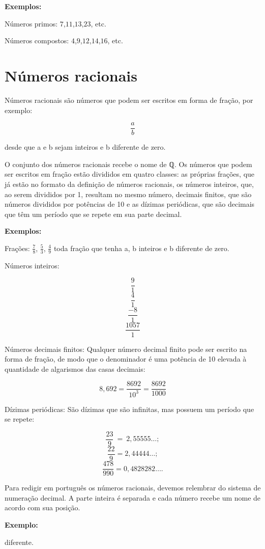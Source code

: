 \textbf{Exemplos:}

Números primos: $7$,$11$,$13$,$23$, etc.

Números compostos: $4$,$9$,$12$,$14$,$16$, etc.

\section{Números racionais}

Números racionais são números que podem ser escritos em forma de fração,
por exemplo:

$$\frac{a}{b}$$

desde que a e b sejam inteiros e b diferente de zero.

O conjunto dos números racionais recebe o nome de ℚ. Os números que
podem ser escritos em fração estão divididos em quatro classes: as
próprias frações, que já estão no formato da definição de números
racionais, os números inteiros, que, ao serem divididos por 1, resultam
no mesmo número, decimais finitos, que são números divididos por
potências de 10 e as dízimas periódicas, que são decimais que têm um
período que se repete em sua parte decimal.

\textbf{Exemplos:}

Frações: $\frac{7}{8}$, $\frac{5}{3}$, $\frac{4}{9}$ toda fração que tenha a,
b inteiros e b diferente de zero.

Números inteiros:

 $$\frac{9}{1}$$
 $$\frac{4}{1}$$ 
 $$\frac{-8}{1}$$
 $$\frac{1057}{1}$$

Números decimais finitos: Qualquer número decimal finito pode ser
escrito na forma de fração, de modo que o denominador é uma potência de
10 elevada à quantidade de algarismos das casas decimais:

$$8,692  = \frac{8692}{10^{3}} = \frac{8692}{1000}$$

Dízimas periódicas: São dízimas que são infinitas, mas possuem um
período que se repete: 

$$\frac{23}{9}\  = \ 2,55555\ldots;$$
$$\frac{22}{9} = 2,44444\ldots;$$
$$\frac{478}{990} = 0,4828282\ldots{}.$$

Para redigir em português os números racionais, devemos relembrar do
sistema de numeração decimal. A parte inteira é separada e cada número
recebe um nome de acordo com sua posição.~

\textbf{Exemplo:} 

diferente.

